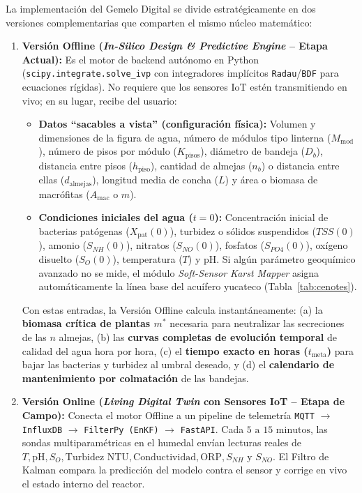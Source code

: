 \documentclass[11pt,letterpaper]{article}
\begin{document}
La implementación del Gemelo Digital se divide estratégicamente en dos versiones complementarias que comparten el mismo núcleo matemático:

\begin{enumerate}[leftmargin=1.5em]
    \item \textbf{Versión Offline (\textit{In-Silico Design \& Predictive Engine} -- Etapa Actual):}
    Es el motor de backend autónomo en Python (\texttt{scipy.integrate.solve\_ivp} con integradores implícitos \texttt{Radau}/\texttt{BDF} para ecuaciones rígidas). No requiere que los sensores IoT estén transmitiendo en vivo; en su lugar, recibe del usuario:
    \begin{itemize}
        \item \textbf{Datos ``sacables a vista'' (configuración física):} Volumen y dimensiones de la figura de agua, número de módulos tipo linterna ($M_{\text{mod}}$), número de pisos por módulo ($K_{\text{pisos}}$), diámetro de bandeja ($D_b$), distancia entre pisos ($h_{\text{piso}}$), cantidad de almejas ($n_b$) o distancia entre ellas ($d_{\text{almejas}}$), longitud media de concha ($L$) y área o biomasa de macrófitas ($A_{\text{mac}}$ o $m$).
        \item \textbf{Condiciones iniciales del agua ($t=0$):} Concentración inicial de bacterias patógenas ($X_{\text{pat}}(0)$), turbidez o sólidos suspendidos ($TSS(0)$), amonio ($S_{NH}(0)$), nitratos ($S_{NO}(0)$), fosfatos ($S_{PO4}(0)$), oxígeno disuelto ($S_O(0)$), temperatura ($T$) y $\text{pH}$. Si algún parámetro geoquímico avanzado no se mide, el módulo \textit{Soft-Sensor Karst Mapper} asigna automáticamente la línea base del acuífero yucateco (Tabla~\ref{tab:cenotes}).
    \end{itemize}
    Con estas entradas, la Versión Offline calcula instantáneamente: (a) la \textbf{biomasa crítica de plantas $m^*$} necesaria para neutralizar las secreciones de las $n$ almejas, (b) las \textbf{curvas completas de evolución temporal} de calidad del agua hora por hora, (c) el \textbf{tiempo exacto en horas ($t_{\text{meta}}$)} para bajar las bacterias y turbidez al umbral deseado, y (d) el \textbf{calendario de mantenimiento por colmatación} de las bandejas.

    \item \textbf{Versión Online (\textit{Living Digital Twin} con Sensores IoT -- Etapa de Campo):}
    Conecta el motor Offline a un pipeline de telemetría \texttt{MQTT} $\to$ \texttt{InfluxDB} $\to$ \texttt{FilterPy (EnKF)} $\to$ \texttt{FastAPI}. Cada $5\text{ a }15\text{ minutos}$, las sondas multiparamétricas en el humedal envían lecturas reales de $T, \text{pH}, S_O, \text{Turbidez NTU}, \text{Conductividad}, \text{ORP}, S_{NH}$ y $S_{NO}$. El Filtro de Kalman compara la predicción del modelo contra el sensor y corrige en vivo el estado interno del reactor.
\end{enumerate}
\end{document}
